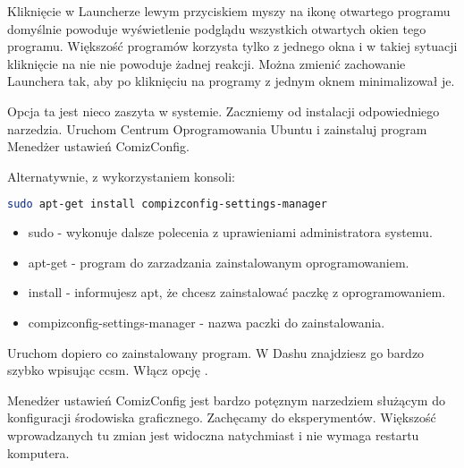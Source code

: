Kliknięcie w Launcherze lewym przyciskiem myszy na ikonę otwartego programu domyślnie powoduje wyświetlenie podglądu wszystkich otwartych okien tego programu. Większość programów korzysta tylko z jednego okna i w takiej sytuacji kliknięcie na nie nie powoduje żadnej reakcji. Można zmienić zachowanie Launchera tak, aby po kliknięciu na programy z jednym oknem minimalizował je.

Opcja ta jest nieco zaszyta w systemie. Zaczniemy od instalacji odpowiedniego narzedzia. Uruchom \textcolor{ubuntu_orange}{Centrum Oprogramowania Ubuntu} i zainstaluj program \textcolor{ubuntu_orange}{Menedżer ustawień ComizConfig}.

Alternatywnie, z wykorzystaniem konsoli:
\begin{lstlisting}[language=bash]
sudo apt-get install compizconfig-settings-manager
\end{lstlisting}
\begin{itemize}
\item \textcolor{ubuntu_orange}{sudo} - wykonuje dalsze polecenia z uprawieniami administratora systemu.
\item \textcolor{ubuntu_orange}{apt-get} - program do zarzadzania zainstalowanym oprogramowaniem.
\item \textcolor{ubuntu_orange}{install} - informujesz apt, że chcesz zainstalować paczkę z oprogramowaniem.
\item \textcolor{ubuntu_orange}{compizconfig-settings-manager} - nazwa paczki do zainstalowania.
\end{itemize}
Uruchom dopiero co zainstalowany program. W Dashu znajdziesz go bardzo szybko wpisując \textcolor{ubuntu_orange}{ccsm}. Włącz opcję .

Menedżer ustawień ComizConfig jest bardzo potęznym narzedziem służącym do konfiguracji środowiska graficznego. Zachęcamy do eksperymentów. Większość wprowadzanych tu zmian jest widoczna natychmiast i nie wymaga restartu komputera.
